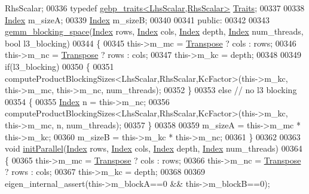 \begin{DoxyCode}
       RhsScalar;
00336     \textcolor{keyword}{typedef} \hyperlink{class_eigen_1_1internal_1_1gebp__traits}{gebp\_traits<LhsScalar,RhsScalar>} 
      \hyperlink{class_eigen_1_1internal_1_1gebp__traits}{Traits};
00337 
00338     \hyperlink{namespace_eigen_a62e77e0933482dafde8fe197d9a2cfde}{Index} m\_sizeA;
00339     \hyperlink{namespace_eigen_a62e77e0933482dafde8fe197d9a2cfde}{Index} m\_sizeB;
00340 
00341   \textcolor{keyword}{public}:
00342 
00343     \hyperlink{class_eigen_1_1internal_1_1gemm__blocking__space}{gemm\_blocking\_space}(\hyperlink{namespace_eigen_a62e77e0933482dafde8fe197d9a2cfde}{Index} rows, \hyperlink{namespace_eigen_a62e77e0933482dafde8fe197d9a2cfde}{Index} cols, 
      \hyperlink{namespace_eigen_a62e77e0933482dafde8fe197d9a2cfde}{Index} depth, \hyperlink{namespace_eigen_a62e77e0933482dafde8fe197d9a2cfde}{Index} num\_threads, \textcolor{keywordtype}{bool} l3\_blocking)
00344     \{
00345       this->m\_mc = \hyperlink{group___core___module_class_eigen_1_1_transpose}{Transpose} ? cols : rows;
00346       this->m\_nc = \hyperlink{group___core___module_class_eigen_1_1_transpose}{Transpose} ? rows : cols;
00347       this->m\_kc = depth;
00348 
00349       \textcolor{keywordflow}{if}(l3\_blocking)
00350       \{
00351         computeProductBlockingSizes<LhsScalar,RhsScalar,KcFactor>(this->m\_kc, this->m\_mc, this->m\_nc, 
      num\_threads);
00352       \}
00353       \textcolor{keywordflow}{else}  \textcolor{comment}{// no l3 blocking}
00354       \{
00355         \hyperlink{namespace_eigen_a62e77e0933482dafde8fe197d9a2cfde}{Index} n = this->m\_nc;
00356         computeProductBlockingSizes<LhsScalar,RhsScalar,KcFactor>(this->m\_kc, this->m\_mc, n, num\_threads);
00357       \}
00358 
00359       m\_sizeA = this->m\_mc * this->m\_kc;
00360       m\_sizeB = this->m\_kc * this->m\_nc;
00361     \}
00362 
00363     \textcolor{keywordtype}{void} \hyperlink{namespace_eigen_a820c0e0460934cc17eb6dacbad54a9f5}{initParallel}(\hyperlink{namespace_eigen_a62e77e0933482dafde8fe197d9a2cfde}{Index} rows, \hyperlink{namespace_eigen_a62e77e0933482dafde8fe197d9a2cfde}{Index} cols, \hyperlink{namespace_eigen_a62e77e0933482dafde8fe197d9a2cfde}{Index} depth, 
      \hyperlink{namespace_eigen_a62e77e0933482dafde8fe197d9a2cfde}{Index} num\_threads)
00364     \{
00365       this->m\_mc = \hyperlink{group___core___module_class_eigen_1_1_transpose}{Transpose} ? cols : rows;
00366       this->m\_nc = \hyperlink{group___core___module_class_eigen_1_1_transpose}{Transpose} ? rows : cols;
00367       this->m\_kc = depth;
00368 
00369       eigen\_internal\_assert(this->m\_blockA==0 && this->m\_blockB==0);

\end{DoxyCode}

